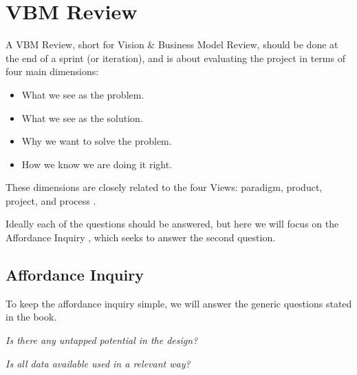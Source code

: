 \section{VBM Review}
A VBM Review, short for Vision \& Business Model Review, should be done at the end of a sprint (or iteration), and is about evaluating the project in terms of four main dimensions:

\begin{itemize}
	\item What we see as the problem.
	\item What we see as the solution.
	\item Why we want to solve the problem.
	\item How we know we are doing it right.
\end{itemize}

These dimensions are closely related to the four Views: paradigm, product, project, and process \citep[pp. 44-47]{essence}.

Ideally each of the questions should be answered, but here we will focus on the Affordance Inquiry \citep[pp. 59-60]{essence}, which seeks to answer the second question.

\subsection*{Affordance Inquiry}
To keep the affordance inquiry simple, we will answer the generic questions stated in the book.

\textit{Is there any untapped potential in the design?}


\textit{Is all data available used in a relevant way?}





